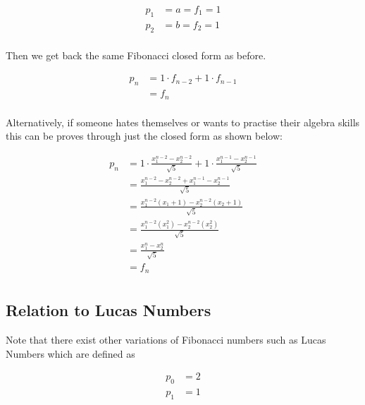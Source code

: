 \documentclass[a4paper]{article}
\begin{document}
\begin{equation*}
\begin{aligned}
p_1 &= a= f_1 = 1  \\
p_2 &= b= f_2 = 1  \\
\end{aligned}
\end{equation*}

Then we get back the same Fibonacci closed form as before.

\begin{equation}
\begin{split}
p_n &= 1 \cdot f_{n-2} + 1 \cdot f_{n-1} \\
&= f_n  \\
\end{split}\label{fib:eq:equation5}
\end{equation}

Alternatively, if someone hates themselves or wants to practise their algebra skills this can be proves through just the closed form as shown below:

\begin{equation*}
\begin{split}
p_n &= 1 \cdot \frac{x_1^{n-2} - x_2^{n-2}}{\sqrt{5}} + 1 \cdot \frac{x_1^{n-1} - x_2^{n-1}}{\sqrt{5}} \\
&= \frac{x_1^{n-2} - x_2^{n-2} + x_1^{n-1} - x_2^{n-1} }{\sqrt{5}} \\
&= \frac{x_1^{n-2}(x_1 + 1) - x_2^{n-2}(x_2 + 1) }{\sqrt{5}} \\
&= \frac{x_1^{n-2}(x_1^2) - x_2^{n-2}(x_2^2) }{\sqrt{5}} \\
&= \frac{x_1^{n}- x_2^{n}}{\sqrt{5}} \\
&= f_n \\
\end{split}
\end{equation*}

\subsection{Relation to Lucas Numbers}\label{fib:subsec:relation-to-lucas-numbers}
Note that there exist other variations of Fibonacci numbers such as Lucas Numbers which are defined as

\begin{equation}
\begin{aligned}
p_0 &= 2  \\
p_1 &= 1  \\
\end{aligned}\label{fib:eq:equation6}
\end{equation}
\end{document}
